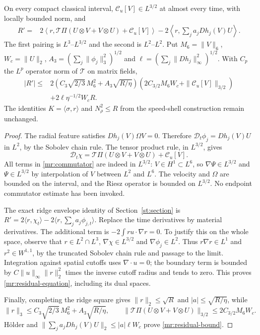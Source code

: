 \begin{proposition}\label{mr:residual}
On every compact classical interval, $\mathcal C_u[V]\in L^{3/2}$ at
almost every time, with locally bounded norm, and
\begin{align}
 R'={}&2\left\langle r,
   \mathcal T\Pi(U\otimes V+V\otimes U)+\mathcal C_u[V]\right\rangle
       -2\left\langle r,\sum_j a_jDh_j(V)U\right\rangle.
       \label{mr:residual-equation}
\end{align}
The first pairing is $L^3$--$L^{3/2}$ and the second is $L^2$--$L^2$.
Put $M_6=\|V\|_6$, $W_c=\|U\|_2$,
$A_3=(\sum_j\|\phi_j\|_3^2)^{1/2}$ and
$\ell=(\sum_j\|Dh_j\|_\infty^2)^{1/2}$. With $C_p$ the
$L^p$ operator norm of $\mathcal T$ on matrix fields,
\begin{align}
 |R'|\le{}&2\left(C_3\sqrt{2/3}\,M_6^2+A_3\sqrt{R/\eta}\right)
        \left(2C_{3/2}M_6W_c+\|\mathcal C_u[V]\|_{3/2}\right)
       \nonumber\\
       &+2\ell\eta^{-1/2}W_cR.\label{mr:residual-bound}
\end{align}
The identities $K=\langle\sigma,r\rangle$ and $N_\rho^2\le R$ from
the speed-shell construction remain unchanged.
\end{proposition}

\begin{proof}
The radial feature satisfies $Dh_j(V)\Omega V=0$. Therefore
$\mathcal D_t\phi_j=Dh_j(V)U$ in $L^2$, by the Sobolev chain rule.
The tensor product rule, in $L^{3/2}$, gives
\[
 \mathcal D_t\chi
     =\mathcal T\Pi(U\otimes V+V\otimes U)+\mathcal C_u[V].
\]
All terms in \eqref{mr:commutator} are indeed in $L^{3/2}$:
$V\in H^1\subset L^6$, so $\nabla\Psi\in L^{3/2}$ and
$\Psi\in L^{3/2}$ by interpolation of $V$ between $L^2$ and $L^6$.
The velocity and $\Omega$ are bounded on the interval, and the Riesz
operator is bounded on $L^{3/2}$. No endpoint commutator estimate has
been invoked.

The exact ridge envelope identity of Section~\ref{st:section} is
$R'=2\langle r,\chi_t\rangle
      -2\langle r,\sum_j a_j\phi_{j,t}\rangle$.
Replace the time derivatives by material derivatives.
The additional term is $-2\int r u\cdot\nabla r=0$.
To justify this on the whole space, observe that $r\in L^2\cap L^3$,
$\nabla\chi\in L^{3/2}$ and $\nabla\phi_j\in L^2$.
Thus $r\nabla r\in L^1$ and $r^2\in W^{1,1}$, by the truncated
Sobolev chain rule and passage to the limit. Integration against spatial
cutoffs uses $\nabla\cdot u=0$; the boundary term is bounded by
$C\|u\|_\infty\|r\|_2^2$ times the inverse cutoff radius and tends to
zero. This proves \eqref{mr:residual-equation}, including its dual spaces.

Finally, completing the ridge square gives
$\|r\|_2\le\sqrt R$ and $|a|\le\sqrt{R/\eta}$, while
\[
 \|r\|_3\le C_3\sqrt{2/3}\,M_6^2+A_3\sqrt{R/\eta},\qquad
 \|\mathcal T\Pi(U\otimes V+V\otimes U)\|_{3/2}
       \le2C_{3/2}M_6W_c.
\]
H\"older and $\|\sum_j a_jDh_j(V)U\|_2\le|a|\ell W_c$
prove \eqref{mr:residual-bound}.
\end{proof}

